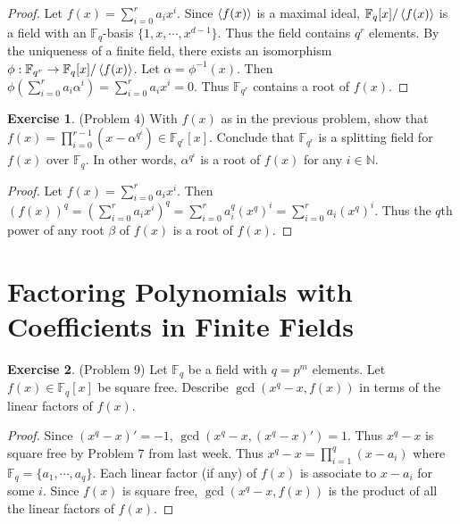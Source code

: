 \documentclass[12pt, psamsfonts]{amsart}
\theoremstyle{definition}
\newtheorem*{exer}{Exercise}
\theoremstyle{remark}
\numberwithin{equation}{section}
\begin{document}
\begin{proof}
  Let $f(x) = \sum_{i=0}^{r} a_ix^i$.
  Since $\ev{f(x)}$ is a maximal ideal, $\mathbb{F}_q[x]/\ev{f(x)}$ is a field with an $\mathbb{F}_q$-basis $\{ 1, x, \cdots, x^{d - 1} \}$.
  Thus the field contains $q^r$ elements.
  By the uniqueness of a finite field, there exists an isomorphism $\phi: \mathbb{F}_{q^r} \rightarrow \mathbb{F}_q[x]/\ev{f(x)}$.
  Let $\alpha = \phi^{-1}(x)$.
  Then $\phi(\sum_{i=0}^{r} a_i\alpha^i) = \sum_{i=0}^{r}a_ix^i = 0$.
  Thus $\mathbb{F}_{q^r}$ contains a root of $f(x)$.
\end{proof}

\begin{exer}{(Problem 4)}
  With $f(x)$ as in the previous problem, show that $f(x) = \prod_{i=0}^{r-1} (x - \alpha^{q^i}) \in \mathbb{F}_{q^r}[x]$.
  Conclude that $\mathbb{F}_{q^r}$ is a splitting field for $f(x)$ over $\mathbb{F}_q$.
  In other words, $\alpha^{q^i}$ is a root of $f(x)$ for any $i \in \mathbb{N}$.
\end{exer}

\begin{proof}
  Let $f(x) = \sum_{i=0}^{r} a_ix^i$.
  Then $(f(x))^q = (\sum_{i=0}^{r} a_ix^i)^q = \sum_{i=0}^{r}a_i^q(x^q)^i = \sum_{i=0}^r a_i(x^q)^i$.
  Thus the $q$th power of any root $\beta$ of $f(x)$ is a root of $f(x)$.
\end{proof}

\section{Factoring Polynomials with Coefficients in Finite Fields}

\begin{exer}{(Problem 9)}
  Let $\mathbb{F}_q$ be a field with $q = p^m$ elements.
  Let $f(x) \in \mathbb{F}_q[x]$ be square free.
  Describe $\gcd(x^q - x, f(x))$ in terms of the linear factors of $f(x)$.
\end{exer}

\begin{proof}
  Since $(x^q - x)' = -1$, $\gcd(x^q - x, (x^q - x)') = 1$.
  Thus $x^q - x$ is square free by Problem 7 from last week.
  Thus $x^q - x = \prod_{i=1}^{q} (x - a_i)$ where $\mathbb{F}_q = \{ a_1, \cdots, a_q \}$.
  Each linear factor (if any) of $f(x)$ is associate to $x - a_i$ for some $i$.
  Since $f(x)$ is square free, $\gcd(x^q - x, f(x))$ is the product of all the linear factors of $f(x)$.
\end{proof}
\end{document}
